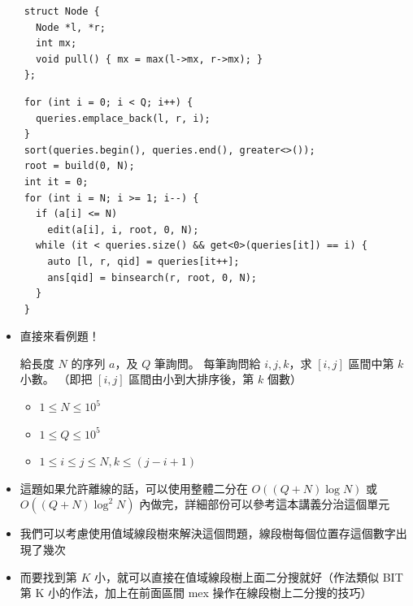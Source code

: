 \documentclass[standalone]{beamer}
\begin{document}
\begin{frame}[fragile]{}
  \begin{verbatim}
    struct Node {
      Node *l, *r;
      int mx;
      void pull() { mx = max(l->mx, r->mx); }
    };
  \end{verbatim}
\end{frame}

\begin{frame}[fragile]{}
  \begin{verbatim}
    for (int i = 0; i < Q; i++) {
      queries.emplace_back(l, r, i);
    }
    sort(queries.begin(), queries.end(), greater<>());
    root = build(0, N);
    int it = 0;
    for (int i = N; i >= 1; i--) {
      if (a[i] <= N)
        edit(a[i], i, root, 0, N);
      while (it < queries.size() && get<0>(queries[it]) == i) {
        auto [l, r, qid] = queries[it++];
        ans[qid] = binsearch(r, root, 0, N);
      }
    }
  \end{verbatim}
\end{frame}

\begin{frame}[fragile]{}
  \begin{itemize}
    \item 直接來看例題！
    \begin{problem}[K-th Number]
      給長度 $N$ 的序列 $a$，及 $Q$ 筆詢問。
      每筆詢問給 $i,j,k$，求 $[i,j]$ 區間中第 $k$ 小數。
      （即把 $[i,j]$ 區間由小到大排序後，第 $k$ 個數）
      
      \begin{itemize}
          \item
              $1 \leq N \leq 10^5$
          \item
              $1 \leq Q \leq 10^5$
          \item
              $1 \leq i \leq j \leq N, k\leq(j-i+1)$
      \end{itemize}
    \end{problem}
  \end{itemize}
\end{frame}

\begin{frame}[fragile]{}
  \begin{itemize}
    \item 這題如果允許離線的話，可以使用整體二分在 $O((Q + N) \log N)$ 或 $O((Q + N) \log^2 N)$ 內做完，詳細部份可以參考這本講義分治這個單元
    \item 我們可以考慮使用值域線段樹來解決這個問題，線段樹每個位置存這個數字出現了幾次
    \item 而要找到第 $K$ 小，就可以直接在值域線段樹上面二分搜就好（作法類似 BIT 第 K 小的作法，加上在前面區間 mex 操作在線段樹上二分搜的技巧）
  \end{itemize}
\end{frame}
\end{document}
